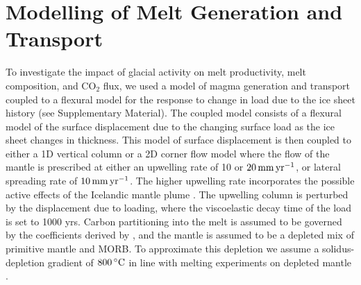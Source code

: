 \documentclass[draft,linenumbers]{agujournal2018}
\begin{document}
\section{Modelling of Melt Generation and Transport}

To investigate the impact of glacial activity on melt productivity, melt composition, and CO$_{2}$ flux, we used a model of magma generation and transport coupled to a flexural model for the response to change in load due to the ice sheet history (see Supplementary Material). The coupled model consists of a flexural model of the surface displacement due to the changing surface load as the ice sheet changes in thickness. This model of surface displacement is then coupled to either a 1D vertical column or a 2D corner flow model where the flow of the mantle is prescribed at either an upwelling rate of 10 or $20\rm\,mm\,yr^{-1}$, or lateral spreading rate of $10\rm\,mm\,yr^{-1}$. The higher upwelling rate incorporates the possible active effects of the Icelandic mantle plume \citep{maclennan-etal-2001,kokfelt-etal-2003}. The upwelling column is perturbed by the displacement due to loading, where the viscoelastic decay time of the load is set to 1000 yrs. Carbon partitioning into the melt is assumed to be governed by the coefficients derived by \citet{rosenthal-etal-2015}, and the mantle is assumed to be a depleted mix of primitive mantle and MORB. To approximate this depletion we assume a solidus-depletion gradient of $800\rm\,^{\circ}C$ in line with melting experiments on depleted mantle \citep{wasylenki-etal-2003}.
\end{document}

